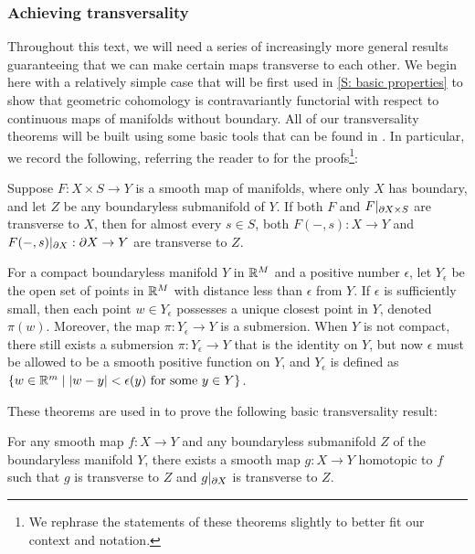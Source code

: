 \subsubsection{Achieving transversality}


Throughout this text, we will need a series of increasingly more general results guaranteeing that we can make certain maps transverse to each other.  We begin here with a relatively simple case that will be first used in  \cref{S: basic properties} to show that geometric cohomology is contravariantly functorial with respect to continuous maps of manifolds without boundary. 
All of our transversality theorems  will be built using some basic tools that can be found in \cite[Section 2.3]{GuPo74}. In particular, we record the following, referring the reader to \cite[Section 2.3]{GuPo74} for the proofs\footnote{We rephrase the statements of these theorems slightly to better fit our context and notation.}:

\begin{theorem}
Suppose $F: X\times S\to Y$ is a smooth map of manifolds, where only $X$ has boundary, and let $Z$ be any boundaryless submanifold of $Y$. If both $F$ and $F|_{\partial X\times S}$ are transverse to $X$, then for almost every $s\in S$, both $F(-,s):X\to Y$ and $F(-,s)|_{\partial X}:\partial X\to Y$ are transverse to $Z$. 
\end{theorem}

\begin{theorem}
For a compact boundaryless manifold $Y$ in $\mathbb{R}^M$ and a positive number $\epsilon$, let $Y_\epsilon$ be the open set of points in $\mathbb{R}^M$ with distance less than $\epsilon$ from $Y$. If $\epsilon$ is sufficiently small, then each point $w\in Y_\epsilon$ possesses a unique closest point in $Y$, denoted $\pi(w)$. Moreover, the map $\pi:Y_\epsilon\to Y$ is a submersion. When $Y$ is not compact, there still exists a submersion $\pi:Y_\epsilon\to Y$ that is the identity on $Y$, but now $\epsilon$ must be allowed to be a smooth positive function on $Y$, and $Y_\epsilon$ is defined as $\{w\in \mathbb{R}^m \mid |w-y|<\epsilon(y) \text{ for some $y\in Y$}\}$.   
\end{theorem}

These theorems are used in \cite{GuPo74} to prove the following basic transversality result:

\begin{theorem}
For any smooth map $f:X\to Y$ and any boundaryless submanifold $Z$ of the boundaryless manifold $Y$, there exists a smooth map $g:X\to Y$ homotopic to $f$ such that $g$ is transverse to $Z$ and $g|_{\partial X}$ is transverse to $Z$.
\end{theorem}

